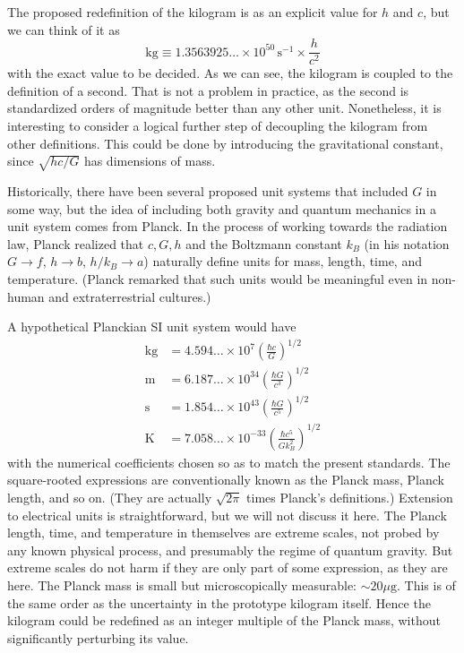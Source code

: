 \documentclass[prb,preprint]{revtex4-1}
\begin{document}
The proposed redefinition of the kilogram is as an explicit value for
$h$ and $c$, but we can think of it as
\begin{equation}
\mathrm{kg} \equiv 1.3563925\ldots \times 10^{50} \, \mathrm{s}^{-1}
                   \times \frac{h}{c^2}
\end{equation}
with the exact value to be decided.  As we can see, the kilogram is
coupled to the definition of a second.  That is not a problem in
practice, as the second is standardized orders of magnitude better
than any other unit.  Nonetheless, it is interesting to consider a
logical further step of decoupling the kilogram from other
definitions.  This could be done by introducing the gravitational
constant, since $\sqrt{hc/G}$ has dimensions of mass.

Historically, there have been several proposed unit systems that
included $G$ in some way,\cite{Tomilin1999} but the idea of including
both gravity and quantum mechanics in a unit system comes from
Planck\cite{Planck99}.  In the process of working towards the
radiation law, Planck realized that $c,G,h$ and the Boltzmann constant
$k_B$ (in his notation $G\rightarrow f$, $h\rightarrow b$,
$h/k_B\rightarrow a$) naturally define units for mass, length, time,
and temperature.  (Planck remarked that such units would be meaningful
even in non-human and extraterrestrial cultures.)

A hypothetical Planckian SI unit system would have
\begin{equation} \label{eq:defs}
\begin{aligned}
\mathrm{kg} &= 4.594\ldots \times 10^7
               \left(\frac{\hbar c}{G}\right)^{\!1/2} \\
\mathrm{m}  &= 6.187\ldots \times 10^{34}
               \left(\frac{\hbar G}{c^3}\right)^{\!1/2} \\
\mathrm{s}  &= 1.854\ldots \times 10^{43}
               \left(\frac{\hbar G}{c^5}\right)^{\!1/2} \\
\mathrm{K}  &= 7.058\ldots \times 10^{-33}
               \left(\frac{\hbar c^5}{Gk_B^2}\right)^{\!1/2}
\end{aligned}
\end{equation}
with the numerical coefficients chosen so as to match the present
standards.  The square-rooted expressions are conventionally known as
the Planck mass, Planck length, and so on.  (They are actually
$\sqrt{2\pi}$ times Planck's definitions.)  Extension to electrical
units is straightforward, but we will not discuss it here.  The Planck
length, time, and temperature in themselves are extreme scales, not
probed by any known physical process, and presumably the regime of
quantum gravity.  But extreme scales do not harm if they are only part
of some expression, as they are here.  The Planck mass is small but
microscopically measurable: $\sim20\mu\mathrm{g}$.  This is of the
same order as the uncertainty in the prototype kilogram itself.  Hence
the kilogram could be redefined as an integer multiple of the Planck
mass, without significantly perturbing its value.
\end{document}
